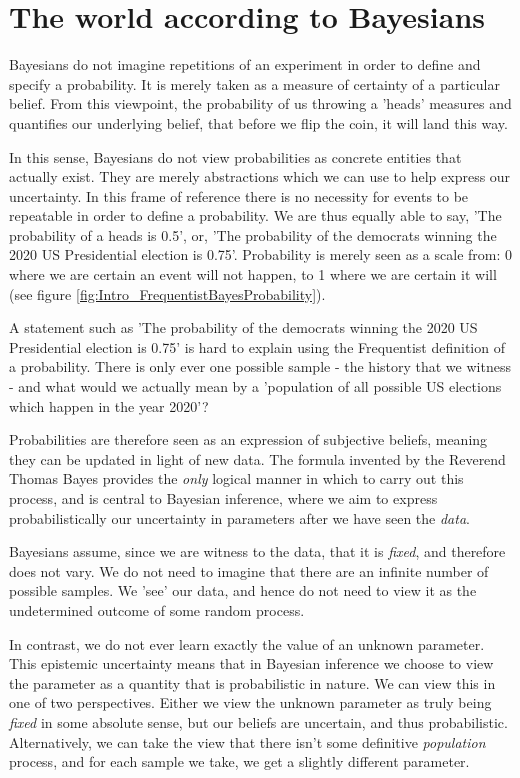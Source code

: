 \documentclass[11pt,fullpage]{book}
\begin{document}
\section{The world according to Bayesians}
Bayesians do not imagine repetitions of an experiment in order to define and specify a probability. It is merely taken as a measure of certainty of a particular belief. From this viewpoint, the probability of us throwing a 'heads' measures and quantifies our underlying belief, that before we flip the coin, it will land this way. 

In this sense, Bayesians do not view probabilities as concrete entities that actually exist. They are merely abstractions which we can use to help express our uncertainty. In this frame of reference there is no necessity for events to be repeatable in order to define a probability. We are thus equally able to say, 'The probability of a heads is 0.5', or, 'The probability of the democrats winning the 2020 US Presidential election is 0.75'. Probability is merely seen as a scale from: 0 where we are certain an event will not happen, to 1 where we are certain it will (see figure \ref{fig:Intro_FrequentistBayesProbability}). 

A statement such as 'The probability of the democrats winning the 2020 US Presidential election is 0.75' is hard to explain using the Frequentist definition of a probability. There is only ever one possible sample - the history that we witness - and what would we actually mean by a 'population of all possible US elections which happen in the year 2020'? 

Probabilities are therefore seen as an expression of subjective beliefs, meaning they can be updated in light of new data. The formula invented by the Reverend Thomas Bayes provides the \textit{only} logical manner in which to carry out this process, and is central to Bayesian inference, where we aim to express probabilistically our uncertainty in parameters after we have seen the \textit{data}. 

Bayesians assume, since we are witness to the data, that it is \textit{fixed}, and therefore does not vary. We do not need to imagine that there are an infinite number of possible samples. We 'see' our data, and hence do not need to view it as the undetermined outcome of some random process.

In contrast, we do not ever learn exactly the value of an unknown parameter. This epistemic uncertainty means that in Bayesian inference we choose to view the parameter as a quantity that is probabilistic in nature. We can view this in one of two perspectives. Either we view the unknown parameter as truly being \textit{fixed} in some absolute sense, but our beliefs are uncertain, and thus probabilistic. Alternatively, we can take the view that there isn't some definitive \textit{population} process, and for each sample we take, we get a slightly different parameter.
\end{document}
